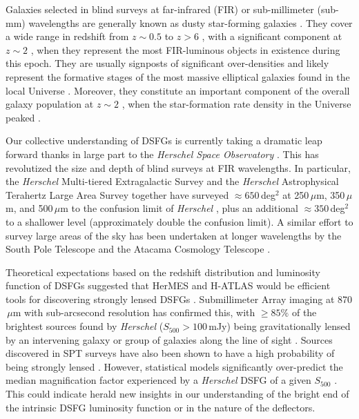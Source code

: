 \documentclass[iop]{emulateapj}
\begin{document}
Galaxies selected in blind surveys at far-infrared (FIR) or sub-millimeter
(sub-mm) wavelengths are generally known as dusty star-forming galaxies
\citep[DSFGs; for a recent review, see][]{Casey:2014lr}.  They cover a wide
range in redshift from $z \sim 0.5$ to $z > 6$ \citep{2005ApJ...622..772C,
Casey:2012qy, Messias:2014fk, Riechers:2013lr}, with a significant component at
$z \sim 2$ \citep{Casey:2012uq, Bothwell:2013lr}, when they represent the most
FIR-luminous objects in existence during this epoch.   They are usually
signposts of significant over-densities \citep{Daddi:2009qy, Capak:2011qy}
\citep[c.f.][]{Robson:2014xy} and likely represent the formative stages of the
most massive elliptical galaxies found in the local Universe
\citep[e.g.,][]{Ivison:2013fk, Fu:2013lr}.  Moreover, they constitute an
important component of the overall galaxy population at $z \sim 2$
\citep[e.g.,][]{Magnelli:2011ul}, when the star-formation rate density in the
Universe peaked \citep[e.g.,][]{Lilly:1996uq, 1996MNRAS.283.1388M}.  

Our collective understanding of DSFGs is currently taking a dramatic leap
forward thanks in large part to the {\it Herschel Space Observatory}
\citep[{\it Herschel};][]{Pilbratt:2010fk}.  This has revolutized the size and
depth of blind surveys at FIR wavelengths.  In particular, the {\it Herschel}
Multi-tiered Extragalactic Survey \citep[HerMES;][]{Oliver:2012lr} and the {\it
Herschel} Astrophysical Terahertz Large Area Survey
\citep[H-ATLAS;][]{2010PASP..122..499E} together have surveyed $\approx
650\,$deg$^2$ at 250$\,\mu$m, 350$\,\mu$m, and 500$\,\mu$m to the confusion
limit of {\it Herschel} \citep[$\sigma \approx 6-7\,$mJy in each
band][]{Nguyen:2010fk}, plus an additional $\approx 350\,$deg$^2$ to a
shallower level (approximately double the confusion limit).  A similar effort
to survey large areas of the sky has been undertaken at longer wavelengths by
the South Pole Telescope \citep[SPT;][]{Carlstrom:2011qy} and the Atacama
Cosmology Telescope \citep{Swetz:2011qy}.

Theoretical expectations based on the redshift distribution and luminosity
function of DSFGs suggested that HerMES and H-ATLAS would be efficient tools
for discovering strongly lensed DSFGs \citep[e.g.,][]{1996MNRAS.283.1340B,
2007MNRAS.377.1557N}.  Submillimeter Array \citep[SMA;][]{Ho:2004lr} imaging at
870$\,\mu$m with sub-arcsecond resolution has confirmed this, with $\geq 85\%$
of the brightest sources found by {\it Herschel} ($S_{500} > 100\,$mJy) being
gravitationally lensed by an intervening galaxy or group of galaxies along the
line of sight \citep{Negrello:2010fk, Conley:2011lr, Riechers:2011uq,
Bussmann:2012lr, Wardlow:2013lr, Bussmann:2013lr}.  Sources discovered in SPT
surveys have also been shown to have a high probability of being strongly
lensed \citep{Vieira:2013fk, Hezaveh:2013fk}.  However, statistical models
significantly over-predict the median magnification factor experienced by a
{\it Herschel} DSFG of a given $S_{500}$ \citep{Bussmann:2013lr}.  This could
indicate herald new insights in our understanding of the bright end of the
intrinsic DSFG luminosity function or in the nature of the deflectors.
\end{document}
